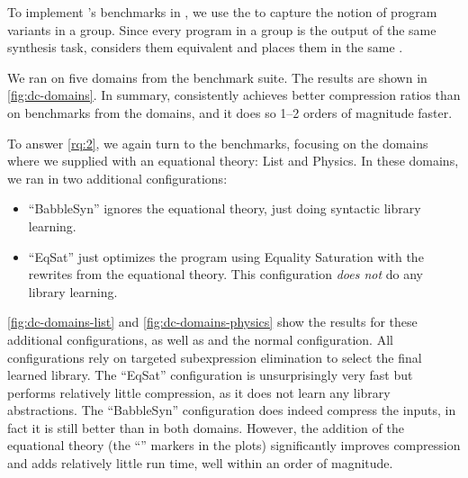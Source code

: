 To implement \dc's benchmarks in \tool,
 we use the \egraph to capture the notion of program variants in a group.
Since every program in a group is the output of the same synthesis task,
 \tool considers them equivalent and places them in the same \eclass.



We ran \tool on five domains from the \dc benchmark suite.
The results are shown in \autoref{fig:dc-domains}.
In summary,
 \tool consistently achieves better compression ratios than
 \dc on benchmarks from the \dc domains,
 and it does so 1--2 orders of magnitude faster.



\label{sec:ablation}
%
To answer \ref{rq:2},
 we again turn to the \dc benchmarks,
 focusing on the domains where we supplied \tool
 with an equational theory: List and Physics.
In these domains, we ran \tool in two additional configurations:
\begin{itemize}
  \item ``BabbleSyn'' ignores the equational theory, just doing syntactic library learning.
  \item ``EqSat'' just optimizes the program using Equality Saturation with the
        rewrites from the equational theory.
        This configuration \emph{does not} do any library learning.
\end{itemize}
\autoref{fig:dc-domains-list} and \ref{fig:dc-domains-physics}
 show the results for these additional configurations,
 as well as \dc and the normal \tool configuration.
All \tool configurations rely on
  targeted subexpression elimination
  to select the final learned library.
The ``EqSat'' configuration is unsurprisingly very fast
 but performs relatively little compression,
 as it does not learn any library abstractions.
The ``BabbleSyn'' configuration
 does indeed compress the inputs,
 in fact it is still better than \dc in both domains.
However,
 the addition of the equational theory (the ``\tool'' markers in the plots)
 significantly improves compression
 and adds relatively little run time,
 well within an order of magnitude.

